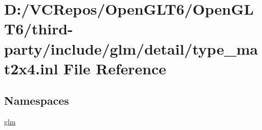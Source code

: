 \hypertarget{type__mat2x4_8inl}{}\section{D\+:/\+V\+C\+Repos/\+Open\+G\+L\+T6/\+Open\+G\+L\+T6/third-\/party/include/glm/detail/type\+\_\+mat2x4.inl File Reference}
\label{type__mat2x4_8inl}
\subsection*{Namespaces}
\begin{DoxyCompactItemize}
\item 
 \mbox{\hyperlink{namespaceglm}{glm}}
\end{DoxyCompactItemize}
